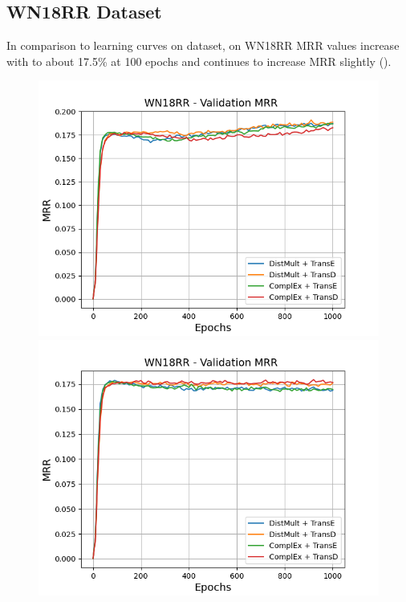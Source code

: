 \subsection{WN18RR Dataset}
\label{subsec:uncertainty_wn18rr}

In comparison to learning curves on \umls dataset, on \textsc{WN18RR} MRR values increase with \origsampling to about 17.5\% at 100 epochs and continues to increase MRR slightly ().
\begin{figure}
    \centering
    \begin{minipage}{.5\textwidth}
      \centering
      \includegraphics[width=0.9\linewidth]{figures/results/gan_train/not_pretrained/random/wn18rr/epochs1000/random_wn18rr_mrrs.png}
    \end{minipage}%
    \begin{minipage}{.5\textwidth}
      \centering
      \includegraphics[width=0.9\linewidth]{figures/results/gan_train/not_pretrained/uncertainty/max_distribution/entropy/wn18rr/uncertainty_wn18rr_mrrs.png}

\end{minipage}
\end{figure}
